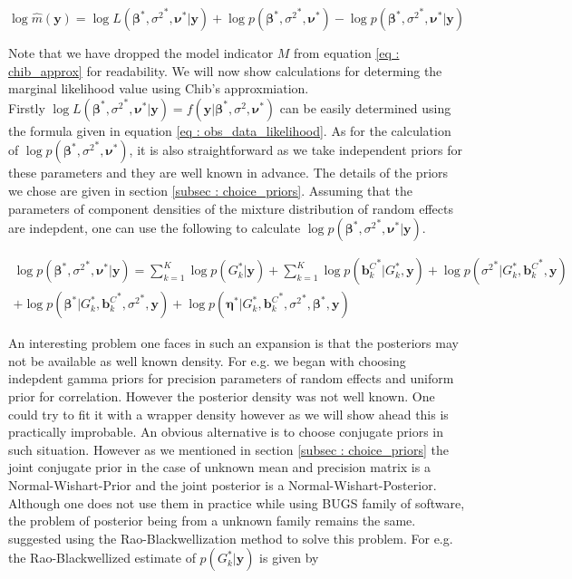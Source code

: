 \begin{equation}
\label{eq : chib_approx}
\log{\hat{m}(\boldsymbol{y})} = \log{L({\boldsymbol{\beta}}^*, {\sigma^2}^*, \boldsymbol{\nu}^*|\boldsymbol{y})} + \log{p({\boldsymbol{\beta}}^*, {\sigma^2}^*, \boldsymbol{\nu}^*)} - \log{p({\boldsymbol{\beta}}^*, {\sigma^2}^*, \boldsymbol{\nu}^*|\boldsymbol{y})}
\end{equation}

Note that we have dropped the model indicator $M$ from equation \ref{eq : chib_approx} for readability. We will now show calculations for determing the marginal likelihood value using Chib's approxmiation.\\ 

Firstly $\log{L({\boldsymbol{\beta}}^*, {\sigma^2}^*, \boldsymbol{\nu}^*|\boldsymbol{y})} = f(\boldsymbol{y}|{\boldsymbol{\beta}}^*, \sigma^2, {\boldsymbol{\nu}}^*)$ can be easily determined using the formula given in equation \ref{eq : obs_data_likelihood}. As for the calculation of $\log{p({\boldsymbol{\beta}}^*, {\sigma^2}^*, \boldsymbol{\nu}^*)}$, it is also straightforward as we take independent priors for these parameters and they are well known in advance. The details of the priors we chose are given in section \ref{subsec : choice_priors}. Assuming that the parameters of component densities of the mixture distribution of random effects are indepdent, one can use the following to calculate $\log{p({\boldsymbol{\beta}}^*, {\sigma^2}^*, \boldsymbol{\nu}^*|\boldsymbol{y})}$.

\begin{multline}
\log{p({\boldsymbol{\beta}}^*, {\sigma^2}^*, \boldsymbol{\nu}^*|\boldsymbol{y})} = 
\sum_{k=1}^K{\log{p(G_k^*|\boldsymbol{y})}} + 
\sum_{k=1}^K{\log{p({\boldsymbol{b}_k^C}^*|G_k^*, \boldsymbol{y})}} + 
\log{p({\sigma^2}^*|G_k^*, {\boldsymbol{b}_k^C}^*, \boldsymbol{y})}\\
+ \log{p({\boldsymbol{\beta}}^*|G_k^*, {\boldsymbol{b}_k^C}^*, {\sigma^2}^*, \boldsymbol{y})} + 
\log{p({\boldsymbol{\eta}}^*|G_k^*, {\boldsymbol{b}_k^C}^*, {\sigma^2}^*,{\boldsymbol{\beta}}^*, \boldsymbol{y})}
\end{multline}

An interesting problem one faces in such an expansion is that the posteriors may not be available as well known density. For e.g. we began with choosing indepdent gamma priors for precision parameters of random effects and uniform prior for correlation. However the posterior density was not well known. One could try to fit it with a wrapper density however as we will show ahead this is practically improbable. An obvious alternative is to choose conjugate priors in such situation. However as we mentioned in section \ref{subsec : choice_priors} the joint conjugate prior in the case of unknown mean and precision matrix is a Normal-Wishart-Prior and the joint posterior is a Normal-Wishart-Posterior. Although one does not use them in practice while using BUGS family of software, the problem of posterior being from a unknown family remains the same. \citet{chib_marginal_1995} suggested using the Rao-Blackwellization method to solve this problem. For e.g. the Rao-Blackwellized estimate of $p(G_k^*|\boldsymbol{y})$ is given by

